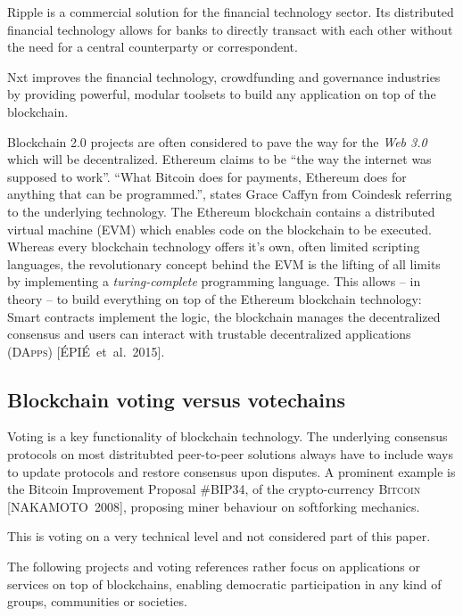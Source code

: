 \documentclass[9pt,oneside]{amsart}
\begin{document}
\begin{multicols}{2}
\begin{itemize}
Ripple is a commercial solution for the financial technology sector. Its distributed financial technology allows for banks to directly transact with each other without the need for a central counterparty or correspondent.\par
Nxt improves the financial technology, crowdfunding and governance industries by providing powerful, modular toolsets to build any application on top of the blockchain.\par
Blockchain 2.0 projects are often considered to pave the way for the \textit{Web 3.0} which will be decentralized. Ethereum claims to be \enquote{the way the internet was supposed to work}. \enquote{What Bitcoin does for payments, Ethereum does for anything that can be programmed.}, states Grace Caffyn from Coindesk referring to the underlying technology. The Ethereum blockchain contains a distributed virtual machine (\textsc{EVM}) which enables code on the blockchain to be executed. Whereas every blockchain technology offers it's own, often limited scripting languages, the revolutionary concept behind the EVM is the lifting of all limits by implementing a \textit{turing-complete} programming language. This allows -- in theory -- to build everything on top of the Ethereum blockchain technology: Smart contracts implement the logic, the blockchain manages the decentralized consensus and users can interact with trustable decentralized applications (\textsc{DApps}) [ÉPIÉ~et~al.~2015].

\subsection{Blockchain voting versus votechains}
Voting is a key functionality of blockchain technology. The underlying consensus protocols on most distritubted peer-to-peer solutions always have to include ways to update protocols and restore consensus upon disputes. A prominent example is the Bitcoin Improvement Proposal \#BIP34, of the crypto-currency \textsc{Bitcoin} [NAKAMOTO~2008], proposing miner behaviour on softforking mechanics.\par
This is voting on a very technical level and not considered part of this paper.\par
The following projects and voting references rather focus on applications or services on top of blockchains, enabling democratic participation in any kind of groups, communities or societies.


\end{itemize}
\end{multicols}
\end{document}
